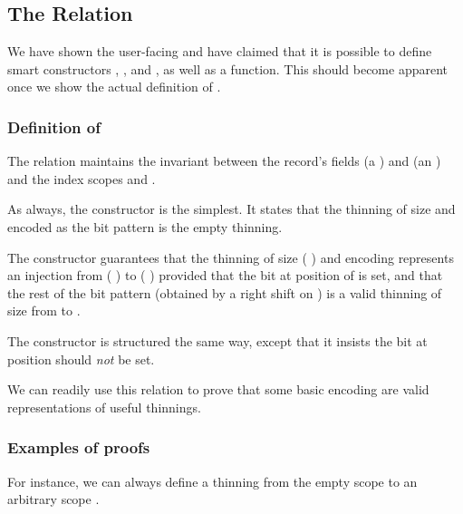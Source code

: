\subsection{The  Relation}\label{sec:thininginternal}

We have shown the user-facing  and have claimed that it is possible
to define smart constructors , ,
and , as well as a  function.
%
This should become apparent once we show the actual definition of .

\subsubsection{Definition of }

The relation maintains the invariant between the record's
fields  (a )
and  (an )
and the index scopes  and .


As always, the  constructor is the simplest.
%
It states that the thinning of size  and encoded as the bit
pattern  is the empty thinning.

The  constructor guarantees that the thinning of
size ( ) and encoding 
represents an injection
from ( \IdrisData{:<} )
to ( \IdrisData{:<} )
provided that the bit at position  of 
is set, and that the rest of the bit pattern (obtained by a right shift
on ) is a valid thinning of size  from
 to .

The  constructor is structured the same way, except that
it insists the bit at position  should \emph{not} be set.

We can readily use this relation to prove that some basic encoding are
valid representations of useful thinnings.

\subsubsection{Examples of  proofs}

For instance, we can always define a thinning from the empty scope to
an arbitrary scope .

